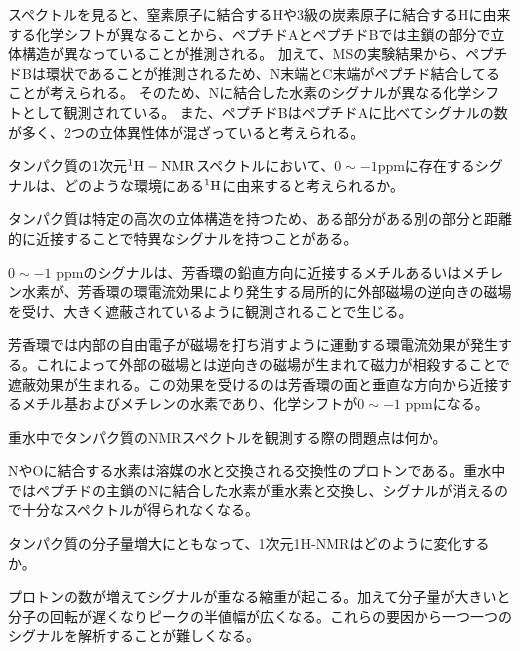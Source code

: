\documentclass[a4paper,papersize,dvipdfmx]{jsarticle}
\begin{document}
スペクトルを見ると、窒素原子に結合するHや3級の炭素原子に結合するHに由来する化学シフトが異なることから、ペプチドAとペプチドBでは主鎖の部分で立体構造が異なっていることが推測される。
加えて、MSの実験結果から、ペプチドBは環状であることが推測されるため、N末端とC末端がペプチド結合してることが考えられる。
そのため、Nに結合した水素のシグナルが異なる化学シフトとして観測されている。
また、ペプチドBはペプチドAに比べてシグナルの数が多く、2つの立体異性体が混ざっていると考えられる。


\begin{tcolorbox}[colback=white,colbacktitle=black!10!white,coltitle=black,title={5}]
タンパク質の1次元$\rm ^1H-NMR$スペクトルにおいて、$0\sim-1$ppmに存在するシグナルは、どのような環境にある$\rm ^1H$に由来すると考えられるか。
\end{tcolorbox}

タンパク質は特定の高次の立体構造を持つため、ある部分がある別の部分と距離的に近接することで特異なシグナルを持つことがある。

$0\sim-1$ ppmのシグナルは、芳香環の鉛直方向に近接するメチルあるいはメチレン水素が、芳香環の環電流効果により発生する局所的に外部磁場の逆向きの磁場を受け、大きく遮蔽されているように観測されることで生じる。

芳香環では内部の自由電子が磁場を打ち消すように運動する環電流効果が発生する。これによって外部の磁場とは逆向きの磁場が生まれて磁力が相殺することで遮蔽効果が生まれる。この効果を受けるのは芳香環の面と垂直な方向から近接するメチル基およびメチレンの水素であり、化学シフトが$0\sim-1$ ppmになる。


\begin{tcolorbox}[colback=white,colbacktitle=black!10!white,coltitle=black,title={6}]
重水中でタンパク質のNMRスペクトルを観測する際の問題点は何か。
\end{tcolorbox}

NやOに結合する水素は溶媒の水と交換される交換性のプロトンである。重水中ではペプチドの主鎖のNに結合した水素が重水素と交換し、シグナルが消えるので十分なスペクトルが得られなくなる。


\begin{tcolorbox}[colback=white,colbacktitle=black!10!white,coltitle=black,title={7}]
タンパク質の分子量増大にともなって、1次元1H-NMRはどのように変化するか。
\end{tcolorbox}

プロトンの数が増えてシグナルが重なる縮重が起こる。加えて分子量が大きいと分子の回転が遅くなりピークの半値幅が広くなる。これらの要因から一つ一つのシグナルを解析することが難しくなる。
\end{document}
